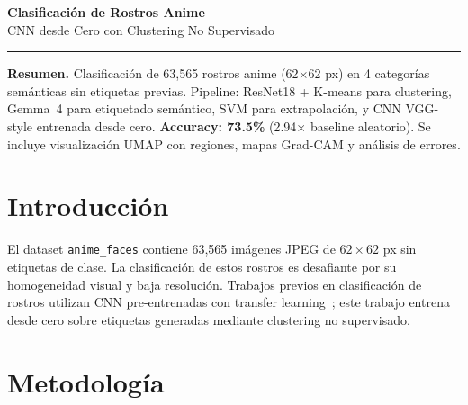\documentclass[10pt,a4paper]{article}
\begin{document}
\thispagestyle{plain}
\begin{center}
{\Huge\color{primary}\textbf{Clasificación de Rostros Anime}}\\[3pt]
{\Large\color{accent}CNN desde Cero con Clustering No Supervisado}\\[8pt]
{\color{grayrule}\rule{0.4\textwidth}{0.4pt}}
\end{center}
\vspace{-8pt}

\begin{tcolorbox}[colback=lightbg,colframe=primary,arc=3pt,fontupper=\small]
\textbf{\color{primary}Resumen.} Clasificación de 63{,}565 rostros anime (62$\times$62 px) en 4 categorías semánticas sin etiquetas previas. Pipeline: ResNet18 + K-means para clustering, Gemma~4 para etiquetado semántico, SVM para extrapolación, y CNN VGG-style entrenada desde cero. \textbf{Accuracy: 73.5\%} (2.94$\times$ baseline aleatorio). Se incluye visualización UMAP con regiones, mapas Grad-CAM y análisis de errores.
\end{tcolorbox}

\section{Introducción}

El dataset \texttt{anime\_faces} contiene 63{,}565 imágenes JPEG de $62{\times}62$ px sin etiquetas de clase. La clasificación de estos rostros es desafiante por su homogeneidad visual y baja resolución. Trabajos previos en clasificación de rostros utilizan CNN pre-entrenadas con transfer learning~\cite{he2016deep,simonyan2015very}; este trabajo entrena desde cero sobre etiquetas generadas mediante clustering no supervisado.

\section{Metodología}
\end{document}
